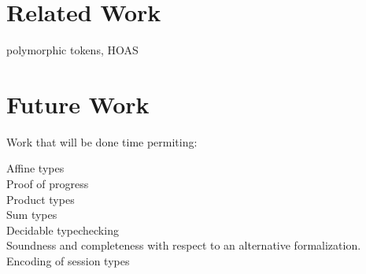 \documentclass[a4paper,UKenglish,cleveref, autoref, thm-restate,authorcolumns]{lipics-v2019}
\begin{document}

\section{Related Work}

\cite{previous-work} polymorphic tokens, HOAS

\cite{typing-with-leftovers}

\cite{Higher-inductive-types-for-congruence}

\cite{LTS-semantics}

\cite{work-on-session-types}


\section{Future Work}

Work that will be done time permiting:

\begin{description}

\item [Affine types]
  
\item [Proof of progress]

\item [Product types]

\item [Sum types]

\item [Decidable typechecking]

\item [Soundness and completeness with respect to an alternative formalization.]

\item [Encoding of session types]

\end{description}



\end{document}

